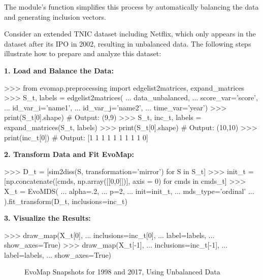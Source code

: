 \documentclass[article]{jss}
\begin{document}
The  module's  function simplifies this process by automatically balancing the data and generating inclusion vectors.

Consider an extended TNIC dataset including Netflix, which only appears in the dataset after its IPO in 2002, 
resulting in unbalanced data. The following steps illustrate how to prepare and analyze this dataset:

\textbf{1. Load and Balance the Data:}

\begin{CodeChunk}
\begin{CodeInput}
>>> from evomap.preprocessing import edgelist2matrices, expand_matrices
>>> S_t, labels = edgelist2matrices(
...     data_unbalanced, 
...     score_var='score', 
...     id_var_i='name1', 
...     id_var_j='name2', 
...     time_var='year')
>>> print(S_t[0].shape)   # Output: (9,9)
>>> S_t, inc_t, labels = expand_matrices(S_t, labels)
>>> print(S_t[0].shape)   # Output: (10,10)
>>> print(inc_t[0])       # Output: [1 1 1 1 1 1 1 1 1 0]
\end{CodeInput}
\end{CodeChunk}

\textbf{2. Transform Data and Fit EvoMap:}

\begin{CodeChunk}
\begin{CodeInput}
>>> D_t = [sim2diss(S, transformation='mirror') for S in S_t]
>>> init_t = [np.concatenate([cmds, np.array([[0,0]])], axis = 0) for cmds in cmds_t]
>>> X_t = EvoMDS(
...     alpha=.2, 
...     p=2,
...     init=init_t, 
...     mds_type='ordinal'
... ).fit_transform(D_t, inclusions=inc_t)    
\end{CodeInput}
\end{CodeChunk}
  
\textbf{3. Visualize the Results:}

\begin{CodeChunk}
\begin{CodeInput}
>>> draw_map(X_t[0], 
...     inclusions=inc_t[0], 
...     label=labels, 
...     show_axes=True)
>>> draw_map(X_t[-1], 
...     inclusions=inc_t[-1], 
...     label=labels, 
...     show_axes=True)
\end{CodeInput}
\end{CodeChunk}
  
\begin{figure}[hbt!]
  \centering
  \caption{\label{fig:unbalanced-data} EvoMap Snapshots for 1998 and 2017, Using Unbalanced Data}
\end{figure}
\end{document}
